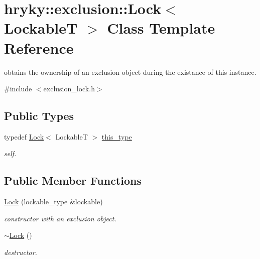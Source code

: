 \hypertarget{classhryky_1_1exclusion_1_1_lock}{\section{hryky\-:\-:exclusion\-:\-:Lock$<$ Lockable\-T $>$ Class Template Reference}
\label{classhryky_1_1exclusion_1_1_lock}
}


obtains the ownership of an exclusion object during the existance of this instance.  




{\ttfamily \#include $<$exclusion\-\_\-lock.\-h$>$}

\subsection*{Public Types}
\begin{DoxyCompactItemize}
\item 
\hypertarget{classhryky_1_1exclusion_1_1_lock_a56d8dcfe2f3ba647f586c526031c56e6}{typedef \hyperlink{classhryky_1_1exclusion_1_1_lock}{Lock}$<$ Lockable\-T $>$ \hyperlink{classhryky_1_1exclusion_1_1_lock_a56d8dcfe2f3ba647f586c526031c56e6}{this\-\_\-type}}\label{classhryky_1_1exclusion_1_1_lock_a56d8dcfe2f3ba647f586c526031c56e6}

\begin{DoxyCompactList}\small\item\em self. \end{DoxyCompactList}\end{DoxyCompactItemize}
\subsection*{Public Member Functions}
\begin{DoxyCompactItemize}
\item 
\hypertarget{classhryky_1_1exclusion_1_1_lock_a742be489a570c6005ea504e815433a97}{\hyperlink{classhryky_1_1exclusion_1_1_lock_a742be489a570c6005ea504e815433a97}{Lock} (lockable\-\_\-type \&lockable)}\label{classhryky_1_1exclusion_1_1_lock_a742be489a570c6005ea504e815433a97}

\begin{DoxyCompactList}\small\item\em constructor with an exclusion object. \end{DoxyCompactList}\item 
\hypertarget{classhryky_1_1exclusion_1_1_lock_a24f3970c57a46e9b03315ee858aa6a71}{\hyperlink{classhryky_1_1exclusion_1_1_lock_a24f3970c57a46e9b03315ee858aa6a71}{$\sim$\-Lock} ()}\label{classhryky_1_1exclusion_1_1_lock_a24f3970c57a46e9b03315ee858aa6a71}

\begin{DoxyCompactList}\small\item\em destructor. \end{DoxyCompactList}\end{DoxyCompactItemize}


